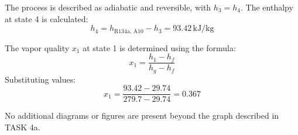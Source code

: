 The process is described as adiabatic and reversible, with \( h_3 = h_4 \).  
The enthalpy at state 4 is calculated:  
\[
h_4 = h_{\text{R134a, A10}} - h_3 = 93.42 \, \text{kJ/kg}
\]  

The vapor quality \( x_1 \) at state 1 is determined using the formula:  
\[
x_1 = \frac{h_1 - h_f}{h_g - h_f}
\]  
Substituting values:  
\[
x_1 = \frac{93.42 - 29.74}{279.7 - 29.74} = 0.367
\]  

No additional diagrams or figures are present beyond the graph described in TASK 4a.